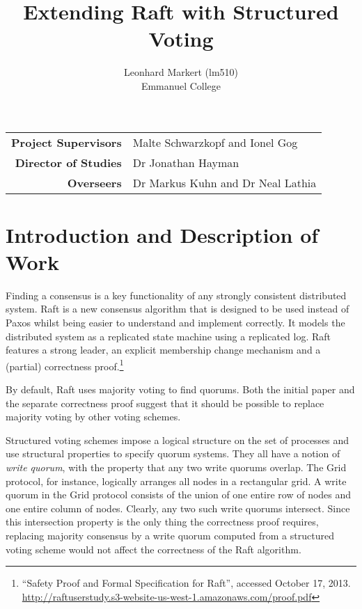\documentclass[12pt]{scrartcl}
\title{Extending Raft with Structured Voting}
\author{Leonhard Markert (lm510) \\ Emmanuel College}
\date{}
\begin{document}
\maketitle

\begin{center}
\begin{tabularx}{350pt}{rX}
\textbf{Project Supervisors} & Malte Schwarzkopf and Ionel Gog \\
\textbf{Director of Studies} & Dr Jonathan Hayman \\
\textbf{Overseers} & Dr Markus Kuhn and Dr Neal Lathia \\
\end{tabularx}
\end{center}

\newpage

\section{Introduction and Description of Work%
  \label{introduction-and-description-of-work}%
}

Finding a consensus is a key functionality of any strongly consistent distributed system. Raft \cite{raft} is a new consensus algorithm that is designed to be used instead of Paxos \cite{paxos} whilst being easier to understand and implement correctly. It models the distributed system as a replicated state machine using a replicated log. Raft features a strong leader, an explicit membership change mechanism and a (partial) correctness proof.\footnote{“Safety Proof and Formal Specification for Raft”, accessed October 17, 2013. \url{http://raftuserstudy.s3-website-us-west-1.amazonaws.com/proof.pdf}}

By default, Raft uses majority voting to find quorums. Both the initial paper and the separate correctness proof suggest that it should be possible to replace majority voting by other voting schemes.

Structured voting schemes \cite{voting} impose a logical structure on the set of processes and use structural properties to specify quorum systems. They all have a notion of \emph{write quorum}, with the property that any two write quorums overlap. The Grid protocol, for instance, logically arranges all nodes in a rectangular grid. A write quorum in the Grid protocol consists of the union of one entire row of nodes and one entire column of nodes. Clearly, any two such write quorums intersect. Since this intersection property is the only thing the correctness proof requires, replacing majority consensus by a write quorum computed from a structured voting scheme would not affect the correctness of the Raft algorithm.
\end{document}

